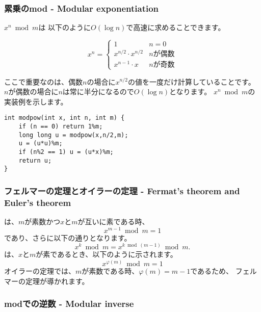 \subsubsection{累乗のmod - Modular exponentiation}

$x^n \bmod m$は
以下のように$O(\log n)$で高速に求めることできます。

\begin{equation*}
    x^n = \begin{cases}
               1        & n = 0\\
               x^{n/2} \cdot x^{n/2} & \text{$n$が偶数}\\
               x^{n-1} \cdot x & \text{$n$が奇数}
           \end{cases}
\end{equation*}

ここで重要なのは、偶数$n$の場合に$x^{n/2}$の値を一度だけ計算していることです。
$n$が偶数の場合に$n$は常に半分になるので$O(\log n)$となります。
$x^n \bmod m$の実装例を示します。

\begin{lstlisting}
int modpow(int x, int n, int m) {
    if (n == 0) return 1%m;
    long long u = modpow(x,n/2,m);
    u = (u*u)%m;
    if (n%2 == 1) u = (u*x)%m;
    return u;
}
\end{lstlisting}

\subsubsection{フェルマーの定理とオイラーの定理 - Fermat's theorem and Euler's theorem}


は、$m$が素数かつ$x$と$m$が互いに素である時、
\[x^{m-1} \bmod m = 1\]
であり、さらに以下の通りとなります。
\[x^k \bmod m = x^{k \bmod (m-1)} \bmod m.\]
は、$x$と$m$が素であるとき、以下のように示されます。
\[x^{\varphi(m)} \bmod m = 1\]
オイラーの定理では、$m$が素数である時、$\varphi(m)=m-1$であるため、
フェルマーの定理が導かれます。

\subsubsection{modでの逆数 - Modular inverse}



